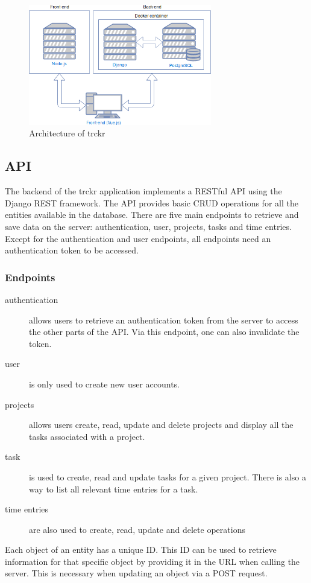 \documentclass[bibliography=totoc, listof=totocnumbered]{scrartcl}
\begin{document}
\begin{figure}[h]
    \includegraphics[width=8cm]{architecture}
    \caption{Architecture of trckr}
    \label{fig:architecture}
\end{figure}

\subsection{API}
The backend of the trckr application implements a RESTful API using the Django
REST framework. The API provides basic CRUD operations for all the entities
available in the database. There are five main endpoints to retrieve and save
data on the server: authentication, user, projects, tasks and time entries. Except
for the authentication and user endpoints, all endpoints need an authentication
token to be accessed.

\subsubsection{Endpoints}
\begin{description}
\item[authentication] allows users to retrieve an authentication token from the
  server to access the other parts of the API. Via this endpoint, one can also
  invalidate the token.
\item[user] is only used to create new user accounts.
\item[projects] allows users create, read, update and delete projects and
  display all the tasks associated with a project.
\item[task] is used to create, read and update tasks for a given project. There
  is also a way to list all relevant time entries for a task.
\item[time entries] are also used to create, read, update and delete operations
\end{description}

Each object of an entity has a unique ID. This ID can be used to retrieve
information for that specific object by providing it in the URL when calling the
server. This is necessary when updating an object via a POST request.
\end{document}
